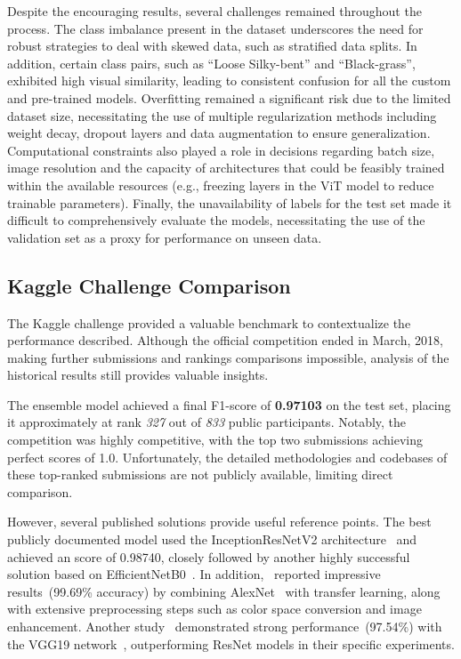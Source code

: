 Despite the encouraging results, several challenges remained throughout the process. The class imbalance present in the dataset underscores the need for robust strategies to deal with skewed data, such as stratified data splits. In addition, certain class pairs, such as ``Loose Silky-bent'' and ``Black-grass'', exhibited high visual similarity, leading to consistent confusion for all the custom and pre-trained models. Overfitting remained a significant risk due to the limited dataset size, necessitating the use of multiple regularization methods including weight decay, dropout layers and data augmentation to ensure generalization. Computational constraints also played a role in decisions regarding batch size, image resolution and the capacity of architectures that could be feasibly trained within the available resources (e.g., freezing layers in the ViT model to reduce trainable parameters). Finally, the unavailability of labels for the test set made it difficult to comprehensively evaluate the models, necessitating the use of the validation set as a proxy for performance on unseen data.

\subsection{Kaggle Challenge Comparison}

The Kaggle challenge provided a valuable benchmark to contextualize the performance described. Although the official competition ended in March, 2018, making further submissions and rankings comparisons impossible, analysis of the historical results still provides valuable insights.

The ensemble model achieved a final F1-score of \textbf{0.97103} on the test set, placing it approximately at rank \textit{327} out of \textit{833} public participants. Notably, the competition was highly competitive, with the top two submissions achieving perfect scores of 1.0. Unfortunately, the detailed methodologies and codebases of these top-ranked submissions are not publicly available, limiting direct comparison.

However, several published solutions provide useful reference points. The best publicly documented model used the InceptionResNetV2 architecture~\cite{DBLP:journals/corr/SzegedyIV16} and achieved an score of 0.98740, closely followed by another highly successful solution based on EfficientNetB0~\cite{DBLP:journals/corr/abs-1905-11946}. In addition,~\cite{8650178} reported impressive results~(99.69\% accuracy) by combining AlexNet~\cite{NIPS2012_c399862d} with transfer learning, along with extensive preprocessing steps such as color space conversion and image enhancement. Another study~\cite{hassan2021plant} demonstrated strong performance~(97.54\%) with the VGG19 network~\cite{simonyan2015deepconvolutionalnetworkslargescale}, outperforming ResNet models in their specific experiments.

